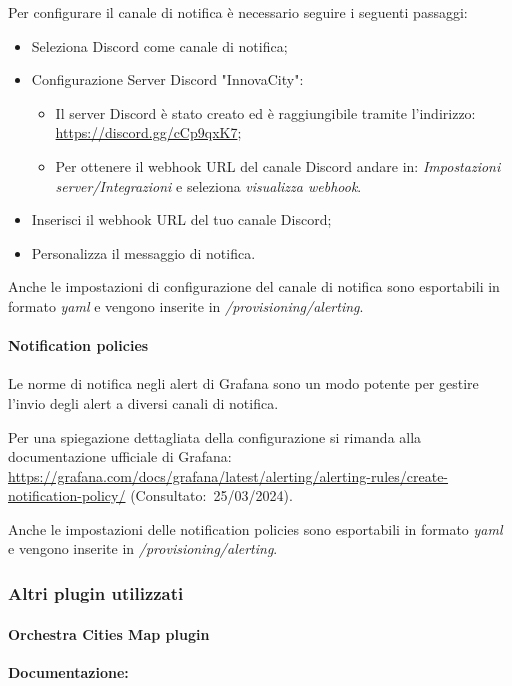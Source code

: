 Per configurare il canale di notifica è necessario seguire i seguenti passaggi:
\begin{itemize}
    \item Seleziona Discord come canale di notifica;
    \item Configurazione Server Discord "InnovaCity":
    \begin{itemize}
        \item Il server Discord è stato creato ed è raggiungibile tramite l'indirizzo: \url{https://discord.gg/cCp9qxK7};
        \item Per ottenere il webhook URL del canale Discord andare in: \textit{Impostazioni server/Integrazioni} e seleziona \textit{visualizza webhook}.
    \end{itemize}
    \item Inserisci il webhook URL del tuo canale Discord;
    \item Personalizza il messaggio di notifica.
    
\end{itemize}

Anche le impostazioni di configurazione del canale di notifica sono esportabili in formato \textit{yaml} e vengono inserite in \textit{/provisioning/alerting}.



\paragraph{Notification policies}
Le norme di notifica negli alert di Grafana sono un modo potente per gestire l'invio degli alert a diversi canali di notifica.

Per una spiegazione dettagliata della configurazione si rimanda alla documentazione ufficiale di Grafana: \url{https://grafana.com/docs/grafana/latest/alerting/alerting-rules/create-notification-policy/} (Consultato:~25/03/2024).

Anche le impostazioni delle notification policies sono esportabili in formato \textit{yaml} e vengono inserite in \textit{/provisioning/alerting}.

\subsubsection{Altri plugin utilizzati}
\paragraph{Orchestra Cities Map plugin}
\textbf{Documentazione:}

